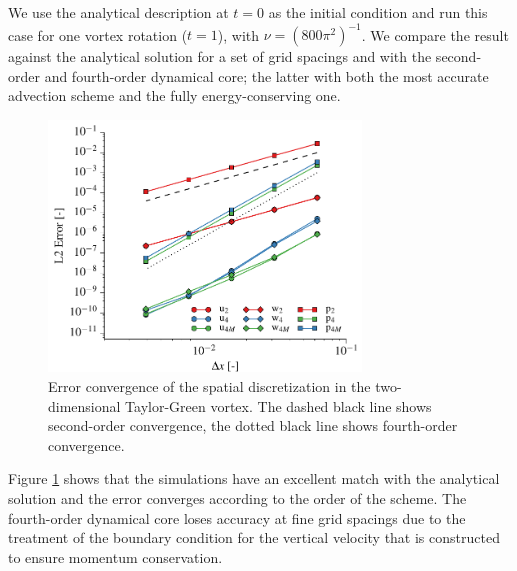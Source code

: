 \documentclass[gmd]{copernicus}
\begin{document}
We use the analytical description at $t=0$ as the initial condition and run this case for one vortex rotation ($t = 1$), with $\nu = (800 \pi^2)^{-1}$. We compare the result against the analytical solution for a set of grid spacings and with the second-order and fourth-order dynamical core; the latter with both the most accurate advection scheme and the fully energy-conserving one.
\begin{figure}[t]
	\vspace*{2mm}
	\begin{center}
		\includegraphics[width=8.3cm]{figs/taylorgreen.pdf}
	\end{center}
	\caption{Error convergence of the spatial discretization in the two-dimensional Taylor-Green vortex. The dashed black line shows second-order convergence, the dotted black line shows fourth-order convergence.}\label{fig:taylorgreen}
\end{figure}

Figure \ref{fig:taylorgreen} shows that the simulations have an excellent match with the analytical solution and the error converges according to the order of the scheme. The fourth-order dynamical core loses accuracy at fine grid spacings due to the treatment of the boundary condition for the vertical velocity that is constructed to ensure momentum conservation.
\end{document}
